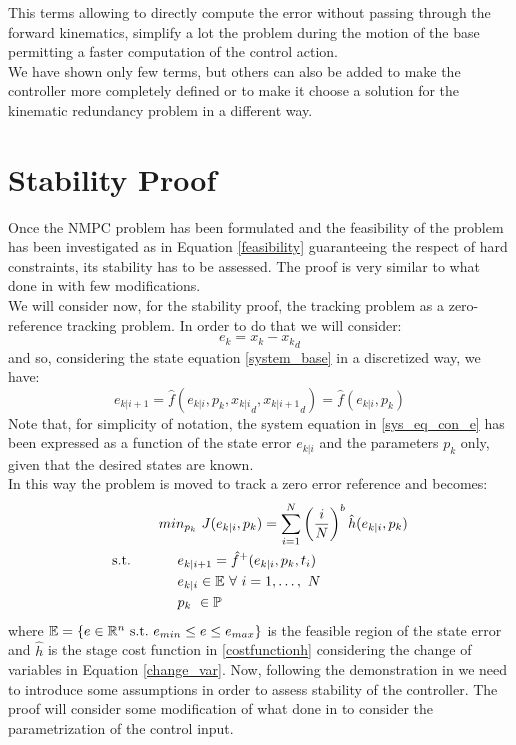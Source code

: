 This terms allowing to directly compute the error without passing through the forward kinematics, simplify a lot the problem during the motion of the base permitting a faster computation of the control action.\\We have shown only few terms, but others can also be added to make the controller more completely defined or to make it choose a solution for the kinematic redundancy problem in a different way. 

\section{Stability Proof}\label{stabproof}

Once the NMPC problem has been formulated and the feasibility of the problem has been investigated as in Equation \ref{feasibility} guaranteeing the respect of hard  constraints, its stability has to be assessed. The proof is very similar to what done in \cite{alamir2018stability} with few modifications.\\
We will consider now, for the stability proof, the tracking problem as a zero-reference tracking problem. In order to do that we will consider:
\begin{equation}\label{change_var}
    e_k=x_k-{x_k}_d
\end{equation}
and so, considering the state equation \ref{system_base} in a discretized way, we have:
\begin{equation}\label{sys_eq_con_e}
    e_{k|i+1}=\hat{f}(e_{k|i},p_k,{x_{k|i}}_d,{x_{k|i+1}}_d)=\hat{f}(e_{k|i},p_k)
\end{equation}
Note that, for simplicity of notation, the system equation in \ref{sys_eq_con_e} has been expressed as a function of the state error ${e_{k|i}}$ and the parameters $p_k$ only, given that the desired states are known.\\
In this way the problem is moved to track a zero error reference and becomes: 
\begin{equation} \label{ourproblem_stab}
\begin{split}
		& min_{{p}_k}\ J({e}_{k|i},{p}_k) =\sum_{i=1}^{N}\left(\frac{i}{N}\right)^b\hat{h}(e_{k|i},{p}_{k}) \\
		\textnormal{s.t.}\qquad
		&\ \ \ \ e_{k|i+1}=\hat{f}^+(e_{k|i},p_k,t_i) \\
		&\ \ \ \ e_{k|i} \in \mathbb{E}\ \forall\ i=1,\dots,\ N  \\
		&\ \ \ \ {p}_k\   \in \mathbb{P}\ \\
	\end{split}	
\end{equation}
where $\mathbb{E} = \lbrace {e}\in \mathbb{R}^n\ \textnormal{s.t.}\ {e}_{min}\leq e\leq e_{max} \rbrace$ is the feasible region of the state error and $\hat{h}$ is the stage cost function in \ref{costfunctionh} considering the change of variables in Equation \ref{change_var}. Now, following the demonstration in \cite{alamir2018stability} we need to introduce some assumptions in order to assess stability of the controller. The proof will consider some modification of what done in \cite{alamir2018stability} to consider the parametrization of the control input. 


